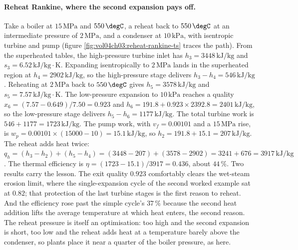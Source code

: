 \paragraph{Reheat Rankine, where the second expansion pays off.} Take a
boiler at $15\,\text{MPa}$ and $550\,\degC$, a reheat back to $550\,\degC$
at an intermediate pressure of $2\,\text{MPa}$, and a condenser at
$10\,\text{kPa}$, with isentropic turbine and pump (figure
\ref{fig:vol04ch03:reheat-rankine-ts} traces the path). From the
superheated tables, the high-pressure turbine inlet has $h_3 = 3448\,
\text{kJ}/\text{kg}$ and $s_3 = 6.52\,\text{kJ}/\text{kg}\cdot\text{K}$.
Expanding isentropically to $2\,\text{MPa}$ lands in the superheated
region at $h_4 = 2902\,\text{kJ}/\text{kg}$, so the high-pressure stage
delivers $h_3 - h_4 = 546\,\text{kJ}/\text{kg}$. Reheating at
$2\,\text{MPa}$ back to $550\,\degC$ gives $h_5 = 3578\,\text{kJ}/\text{kg}$
and $s_5 = 7.57\,\text{kJ}/\text{kg}\cdot\text{K}$. The low-pressure
expansion to $10\,\text{kPa}$ reaches a quality $x_6 = (7.57 - 0.649)/
7.50 = 0.923$ and $h_6 = 191.8 + 0.923 \times 2392.8 = 2401\,\text{kJ}/
\text{kg}$, so the low-pressure stage delivers $h_5 - h_6 = 1177\,\text{kJ}
/\text{kg}$. The total turbine work is $546 + 1177 = 1723\,\text{kJ}/
\text{kg}$. The pump work, with $v_f = 0.00101$ and a $15\,\text{MPa}$
rise, is $w_p = 0.00101 \times (15000 - 10) = 15.1\,\text{kJ}/\text{kg}$,
so $h_2 = 191.8 + 15.1 = 207\,\text{kJ}/\text{kg}$. The reheat adds heat
twice: $q_h = (h_3 - h_2) + (h_5 - h_4) = (3448 - 207) + (3578 - 2902) =
3241 + 676 = 3917\,\text{kJ}/\text{kg}$. The thermal efficiency is
$\eta = (1723 - 15.1)/3917 = 0.436$, about $44\,\%$. Two results carry the
lesson. The exit quality $0.923$ comfortably clears the wet-steam erosion
limit, where the single-expansion cycle of the second worked example sat
at $0.82$; that protection of the last turbine stages is the first reason
to reheat. And the efficiency rose past the simple cycle's $37\,\%$
because the second heat addition lifts the average temperature at which
heat enters, the second reason. The reheat pressure is itself an
optimisation: too high and the second expansion is short, too low and the
reheat adds heat at a temperature barely above the condenser, so plants
place it near a quarter of the boiler pressure, as here.



